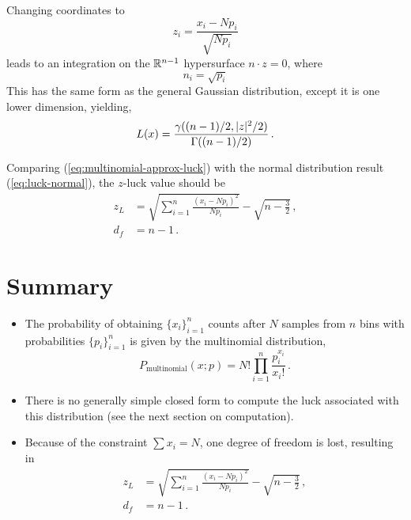 Changing coordinates to
\begin{equation}
z_i = \frac{x_i-Np_i}{\sqrt{Np_i}}
\end{equation}
leads to an integration on the $\mathbb{R}^{n-1}$ hypersurface $n \cdot z = 0$, where
\begin{equation}
n_i=\sqrt{p_i}
\end{equation}
This has the same form as the general Gaussian distribution, except it is one lower dimension, yielding,
\begin{equation}
\index{multinomial ! luck (approximate)}
\label{eq:multinomial-approx-luck}
L(x)=\frac{\gamma((n-1)/2,|z|^2/2)}{\Gamma((n-1)/2)} \,.
\end{equation}

Comparing (\ref{eq:multinomial-approx-luck}) with the normal distribution result (\ref{eq:luck-normal}), the $z$-luck value should be
\begin{align}
z_L &= \sqrt{\sum_{i=1}^{n}{\frac{(x_i-Np_i)^2}{Np_i}}}-\sqrt{n-\frac{3}{2}} \,, \\
d_f &= n-1 \,.
\end{align}

\section{Summary}
\begin{itemize}
\item The probability of obtaining $\{x_i\}_{i=1}^{n}$ counts after $N$ samples from $n$ bins with probabilities $\{p_i\}_{i=1}^{n}$ is given by the multinomial distribution,
\begin{equation}
P_{\text{multinomial}}(x;p)={N!}\prod_{i=1}^{n} \frac{p_i^{x_i}}{x_i!} \,. 
\end{equation}
\item There is no generally simple closed form to compute the luck associated with this distribution (see the next section on computation).
\item Because of the constraint $\sum x_i = N$, one degree of freedom is lost, resulting in
\begin{align}
z_L &= \sqrt{\sum_{i=1}^{n}{\frac{(x_i-Np_i)^2}{Np_i}}}-\sqrt{n-\frac{3}{2}} \,, \\
d_f &= n-1 \,.
\end{align}
\end{itemize}

